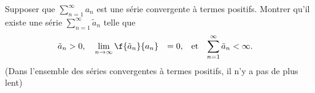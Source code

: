 
\begin{exercice}\label{exo0063}

Supposer que $\sum_{n=1}^\infty a_n$ est une série convergente à termes positifs. Montrer qu'il existe une série $\sum_{n=1}^\infty \tilde{a}_n$  telle que
\begin{equation}
	\begin{aligned}[]
		\tilde{a}_n					&>0,&&
		\lim_{n\rightarrow \infty}\f{\tilde{a}_n}{a_n}	&= 0,&&
		\text{et}&&
		\sum_{n=1}^\infty \tilde{a}_n			&<\infty.
	\end{aligned}
\end{equation}
(Dans l'ensemble des séries convergentes à termes positifs, il n'y a pas de plus lent)

\end{exercice}
